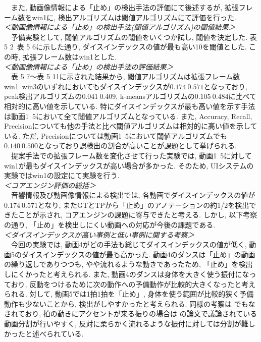 \documentclass[paper]{ieicej}
\begin{document}
　また, 動画像情報による「止め」の検出手法の評価にて後述するが, 拡張フレーム数をwin1に, 検出アルゴリズムは閾値アルゴリズムにて評価を行った. \\
\textit{＜動画像情報による「止め」の検出手法(閾値アルゴリズム)の閾値結果＞}\\
　予備実験として, 閾値アルゴリズムの閾値をいくつか試し, 閾値を決定した. 表 5 2~表 5 6に示した通り, ダイスインデックスの値が最も高い10を閾値とした. この時, 拡張フレーム数はwin1とした. \\
\textit{＜動画像情報による「止め」の検出手法の評価結果＞}\\
　表 5 7～表 5 11に示された結果から, 閾値アルゴリズムは拡張フレーム数win1~win3のいずれにおいてもダイスインデックスが$0.174~0.571$となっており, peak検出アルゴリズムの$0.041~0.409$, k-meansアルゴリズムの$0.105~0.484$に比べて相対的に高い値を示している. 特にダイスインデックスが最も高い値を示す手法は動画1~5において全て閾値アルゴリズムとなっている. また, Accuracy, Recall, Precisionについても他の手法と比べ閾値アルゴリズムは相対的に高い値を示している. ただ, Precisionについては動画1~5において閾値アルゴリズムでも$0.140~0.500$となっており誤検出の割合が高いことが課題として挙げられる. \\
　提案手法での拡張フレーム数を変化させて行った実験では, 動画1~5に対してwin1が最もダイスインデックスが高い場合が多かった. そのため, UIシステムの実験ではwin1の設定にて実験を行う. \\
\textit{＜コアエンジン評価の総括＞}\\
　音響情報及び動画像情報による検出では, 各動画でダイスインデックスの値が$0.174~0.571$となり, またGTとTPから「止め」のアノテーションの約1/2を検出できたことが示され, コアエンジンの課題に寄与できたと考える. しかし, 以下考察の通り, 「止め」を検出しにくい動画への対応が今後の課題である.\\
\textit{＜ダイスインデックスが高い事例と低い事例に関する考察＞}\\
　今回の実験では, 動画4がどの手法も総じてダイスインデックスの値が低く, 動画5のダイスインデックスの値が最も高かった. 動画4のダンスは「止め」の動画の繰り返しでありつつも, やや流れるような動きであったため, 「止め」を検出しにくかったと考えられる. また, 動画4のダンスは身体を大きく使う振付になっており, 反動をつけるために次の動作への予備動作が比較的大きくなったと考えられる. 対して, 動画5では1拍1拍を「止め」, 身体を使う範囲が比較的狭く予備動作も少ないことから, 検出がしやすかったと考えられる. 同様の考察は \cite{ref16}でもなされており, 拍の動きにアクセントが来る振りの場合は \cite{ref16}の論文で議論されている動画分割が行いやすく, 反対に柔らかく流れるような振付に対しては分割が難しかったと述べられている. 
\end{document}
